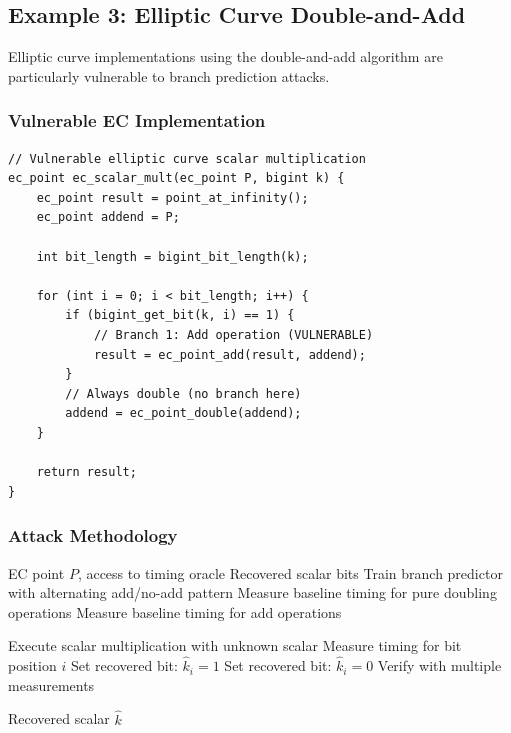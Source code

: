 \documentclass[11pt,a4paper]{article}
\theoremstyle{definition}
\begin{document}
\subsection{Example 3: Elliptic Curve Double-and-Add}

Elliptic curve implementations using the double-and-add algorithm are particularly vulnerable to branch prediction attacks.

\subsubsection{Vulnerable EC Implementation}

\begin{lstlisting}[caption={Elliptic Curve Double-and-Add (Vulnerable)}]
// Vulnerable elliptic curve scalar multiplication
ec_point ec_scalar_mult(ec_point P, bigint k) {
    ec_point result = point_at_infinity();
    ec_point addend = P;
    
    int bit_length = bigint_bit_length(k);
    
    for (int i = 0; i < bit_length; i++) {
        if (bigint_get_bit(k, i) == 1) {
            // Branch 1: Add operation (VULNERABLE)
            result = ec_point_add(result, addend);
        }
        // Always double (no branch here)
        addend = ec_point_double(addend);
    }
    
    return result;
}
\end{lstlisting}

\subsubsection{Attack Methodology}

\begin{algorithm}
\caption{EC Double-and-Add Branch Attack}
\begin{algorithmic}[1]
\REQUIRE EC point $P$, access to timing oracle
\ENSURE Recovered scalar bits
\STATE Train branch predictor with alternating add/no-add pattern
\STATE Measure baseline timing for pure doubling operations
\STATE Measure baseline timing for add operations

    \STATE Execute scalar multiplication with unknown scalar
    \STATE Measure timing for bit position $i$
        \STATE Set recovered bit: $\hat{k}_i = 1$
    \ELSE
        \STATE Set recovered bit: $\hat{k}_i = 0$
    \ENDIF
    \STATE Verify with multiple measurements
\ENDFOR

\RETURN Recovered scalar $\hat{k}$
\end{algorithmic}
\end{algorithm}
\end{document}
